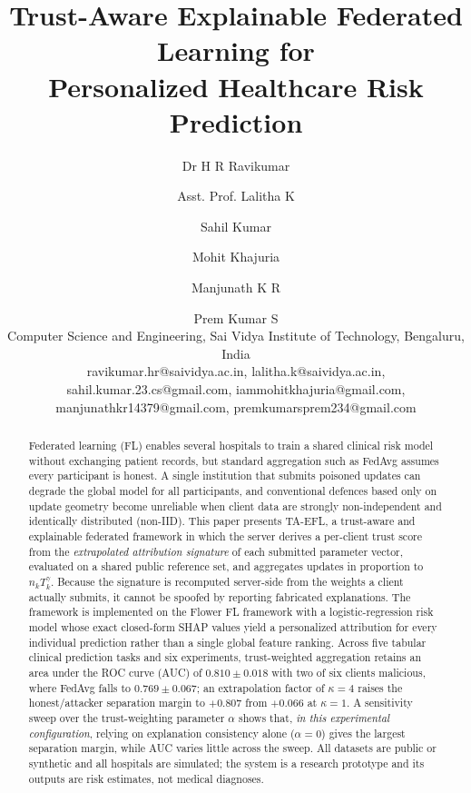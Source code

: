 \documentclass[10pt,twocolumn,letterpaper]{article}
\begin{document}
\title{Trust-Aware Explainable Federated Learning for\\Personalized
Healthcare Risk Prediction}

\author{Dr H R Ravikumar \and Asst. Prof. Lalitha K \and Sahil Kumar \and Mohit Khajuria \and Manjunath K R \and Prem Kumar S \\ Computer Science and Engineering, Sai Vidya Institute of Technology, Bengaluru, India \\ ravikumar.hr@saividya.ac.in, lalitha.k@saividya.ac.in, sahil.kumar.23.cs@gmail.com, iammohitkhajuria@gmail.com, manjunathkr14379@gmail.com, premkumarsprem234@gmail.com}

\date{}
\maketitle

\begin{abstract}
Federated learning (FL) enables several hospitals to train a shared clinical
risk model without exchanging patient records, but standard aggregation such
as FedAvg assumes every participant is honest. A single institution that
submits poisoned updates can degrade the global model for all participants,
and conventional defences based only on update geometry become unreliable
when client data are strongly non-independent and identically distributed
(non-IID). This paper presents TA-EFL, a trust-aware and explainable
federated framework in which the server derives a per-client trust score from
the \emph{extrapolated attribution signature} of each submitted parameter
vector, evaluated on a shared public reference set, and aggregates updates in
proportion to $n_k T_k^{\gamma}$. Because the signature is recomputed
server-side from the weights a client actually submits, it cannot be spoofed
by reporting fabricated explanations. The framework is implemented on the
Flower FL framework with a logistic-regression risk model whose exact
closed-form SHAP values yield a personalized attribution for every
individual prediction rather than a single global feature ranking. Across five
tabular clinical prediction tasks and six experiments, trust-weighted
aggregation retains an area under the ROC curve (AUC) of $0.810 \pm 0.018$
with two of six clients malicious, where FedAvg falls to $0.769 \pm 0.067$;
an extrapolation factor of $\kappa=4$ raises the honest/attacker separation
margin to $+0.807$ from $+0.066$ at $\kappa=1$. A sensitivity sweep over the
trust-weighting parameter $\alpha$ shows that, \emph{in this experimental
configuration}, relying on explanation consistency alone ($\alpha=0$) gives
the largest separation margin, while AUC varies little across the sweep. All
datasets are public or synthetic and all hospitals are simulated; the system
is a research prototype and its outputs are risk estimates, not medical
diagnoses.
\end{abstract}
\end{document}
